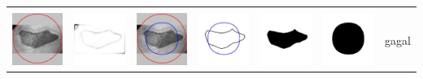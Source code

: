 \begin{table}[H]
\begin{tabular}{|m{0.7in}|m{0.7in}|m{0.7in}|m{0.7in}|m{0.7in}|m{0.7in}|m{0.7in}|}
		&  &  & & & &  \\
		\includegraphics[width=0.7in]{dataset/dataset_3/luka_merah/ready/24_integer_init.jpg}&
		\includegraphics[width=0.7in]{dataset/dataset_3/luka_merah/ready/24_integer_ext.jpg}&
		\includegraphics[width=0.7in]{dataset/dataset_3/luka_merah/ready/24_integer_result.jpg}&
		\includegraphics[width=0.7in]{dataset/dataset_3/luka_merah/ready/24_gt_r_integer.jpg}&
		\includegraphics[width=0.7in]{dataset/dataset_3/luka_merah/ready/24_r.jpg}&
		\includegraphics[width=0.7in]{dataset/dataset_3/luka_merah/ready/24_integer_r.jpg}&
		gagal\\
		\hline
		

\end{tabular}
\end{table}
